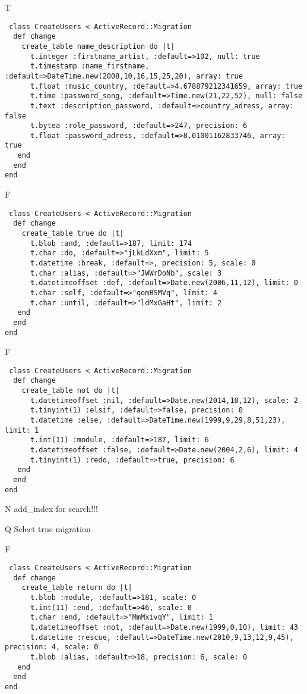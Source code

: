 T
\begin{verbatim}
 class CreateUsers < ActiveRecord::Migration 
  def change 
    create_table name_description do |t| 
      t.integer :firstname_artist, :default=>102, null: true
      t.timestamp :name_firstname, :default=>DateTime.new(2008,10,16,15,25,20), array: true
      t.float :music_country, :default=>4.678879212341659, array: true
      t.time :password_song, :default=>Time.new(21,22,52), null: false
      t.text :description_password, :default=>country_adress, array: false
      t.bytea :role_password, :default=>247, precision: 6
      t.float :password_adress, :default=>8.01001162833746, array: true
   end 
  end 
end
\end{verbatim}

F
\begin{verbatim}
 class CreateUsers < ActiveRecord::Migration 
  def change 
    create_table true do |t| 
      t.blob :and, :default=>187, limit: 174
      t.char :do, :default=>"jLkLdXxm", limit: 5
      t.datetime :break, :default=>, precision: 5, scale: 0
      t.char :alias, :default=>"JWWrDoNb", scale: 3
      t.datetimeoffset :def, :default=>Date.new(2006,11,12), limit: 0
      t.char :self, :default=>"qomBSMVq", limit: 4
      t.char :until, :default=>"ldMxGaHt", limit: 2
   end 
  end 
end
\end{verbatim}

F
\begin{verbatim}
 class CreateUsers < ActiveRecord::Migration 
  def change 
    create_table not do |t| 
      t.datetimeoffset :nil, :default=>Date.new(2014,10,12), scale: 2
      t.tinyint(1) :elsif, :default=>false, precision: 0
      t.datetime :else, :default=>DateTime.new(1999,9,29,8,51,23), limit: 1
      t.int(11) :module, :default=>187, limit: 6
      t.datetimeoffset :false, :default=>Date.new(2004,2,6), limit: 4
      t.tinyint(1) :redo, :default=>true, precision: 6
   end 
  end 
end
\end{verbatim}
N
add_index for search!!!
  
Q
Select true migration

F
\begin{verbatim}
 class CreateUsers < ActiveRecord::Migration 
  def change 
    create_table return do |t| 
      t.blob :module, :default=>181, scale: 0
      t.int(11) :end, :default=>46, scale: 0
      t.char :end, :default=>"MmMxivqY", limit: 1
      t.datetimeoffset :not, :default=>Date.new(1999,0,10), limit: 43
      t.datetime :rescue, :default=>DateTime.new(2010,9,13,12,9,45), precision: 4, scale: 0
      t.blob :alias, :default=>18, precision: 6, scale: 0
   end 
  end 
end
\end{verbatim}

